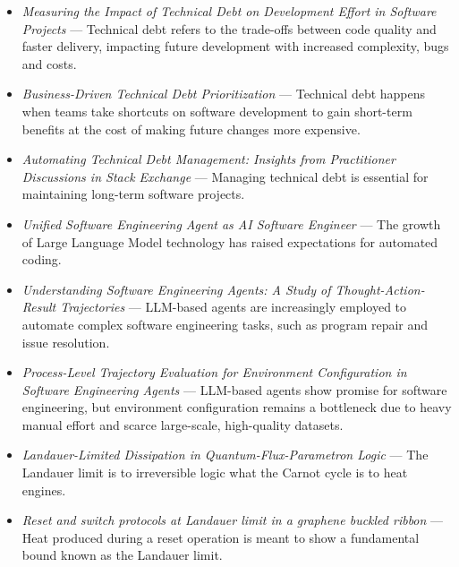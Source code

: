 \documentclass[11pt,a4paper]{article}
\providecommand{\textcite}[1]{\cite{#1}}
\begin{document}
\begin{itemize}[leftmargin=1.3em,itemsep=2pt]
\item \textcite{arxiv2502_16277} \emph{Measuring the Impact of Technical Debt on Development Effort in Software Projects} --- Technical debt refers to the trade-offs between code quality and faster delivery, impacting future development with increased complexity, bugs and costs.
\item \textcite{arxiv1908_01347} \emph{Business-Driven Technical Debt Prioritization} --- Technical debt happens when teams take shortcuts on software development to gain short-term benefits at the cost of making future changes more expensive.
\item \textcite{arxiv2502_03153} \emph{Automating Technical Debt Management: Insights from Practitioner Discussions in Stack Exchange} --- Managing technical debt is essential for maintaining long-term software projects.
\item \textcite{arxiv2506_14683} \emph{Unified Software Engineering Agent as AI Software Engineer} --- The growth of Large Language Model technology has raised expectations for automated coding.
\item \textcite{arxiv2506_18824} \emph{Understanding Software Engineering Agents: A Study of Thought-Action-Result Trajectories} --- LLM-based agents are increasingly employed to automate complex software engineering tasks, such as program repair and issue resolution.
\item \textcite{arxiv2510_25694} \emph{Process-Level Trajectory Evaluation for Environment Configuration in Software Engineering Agents} --- LLM-based agents show promise for software engineering, but environment configuration remains a bottleneck due to heavy manual effort and scarce large-scale, high-quality datasets.
\item \textcite{arxiv2504_04284} \emph{Landauer-Limited Dissipation in Quantum-Flux-Parametron Logic} --- The Landauer limit is to irreversible logic what the Carnot cycle is to heat engines.
\item \textcite{arxiv1507_07450} \emph{Reset and switch protocols at Landauer limit in a graphene buckled ribbon} --- Heat produced during a reset operation is meant to show a fundamental bound known as the Landauer limit.
\end{itemize}
\end{document}
